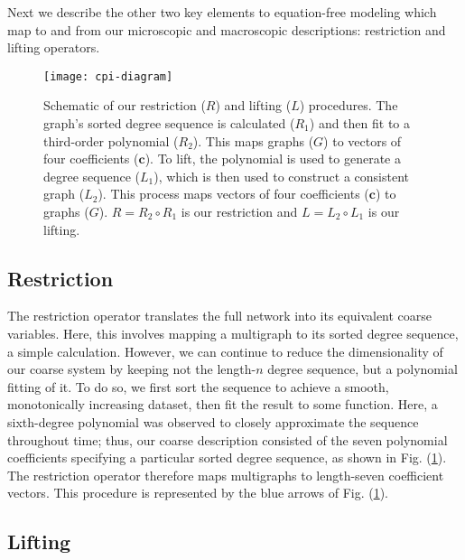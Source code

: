 \documentclass[epjST, final]{svjour}
\begin{document}
\begin{onehalfspace}
Next we describe the other two key elements to equation-free modeling
which map to and from our microscopic and macroscopic descriptions:
restriction and lifting operators.

\begin{figure}[ht!]
  \centering
  \texttt{[image: cpi-diagram]}
  \caption{Schematic of our restriction ($R$) and lifting ($L$)
    procedures. The graph's sorted degree sequence is calculated
    ($R_1$) and then fit to a third-order polynomial ($R_2$). This
    maps graphs ($G$) to vectors of four coefficients
    ($\mathbf{c}$). To lift, the polynomial is used to generate a
    degree sequence ($L_1$), which is then used to construct a
    consistent graph ($L_2$). This process maps vectors of
    four coefficients ($\mathbf{c}$) to graphs
    ($G$). $R = R_2 \circ R_1 $ is our restriction and $L = L_2 \circ
    L_1$ is our lifting. \label{fig:cpi-diagram}}
\end{figure}


\subsection{Restriction}

The restriction operator translates the full network into its equivalent coarse variables. Here, this involves mapping a multigraph to its sorted degree sequence, a simple calculation. However, we can continue to reduce the dimensionality of our coarse system by keeping not the length-$n$ degree sequence, but a polynomial fitting of it. To do so, we first sort the sequence to achieve a smooth, monotonically increasing dataset, then fit the result to some function. Here, a sixth-degree polynomial was observed to closely approximate the sequence throughout time; thus, our coarse description consisted of the seven polynomial coefficients specifying a particular sorted degree sequence, as shown in Fig. (\ref{fig:cpi-diagram}). The restriction operator therefore maps multigraphs to length-seven coefficient vectors. This procedure is represented by the blue arrows of Fig. (\ref{fig:cpi-diagram}).

\subsection{Lifting}


\end{onehalfspace}
\end{document}
